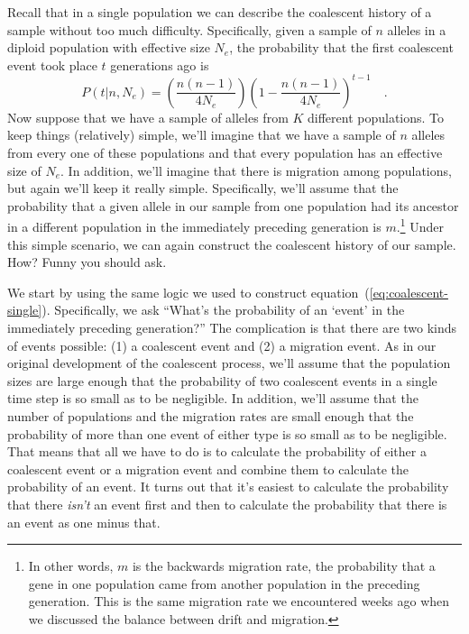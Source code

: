 \documentclass[12pt]{article}
\begin{document}
Recall that in a single population we can describe the coalescent
history of a sample without too much difficulty. Specifically, given a
sample of $n$ alleles in a diploid population with effective size
$N_e$, the probability that the first coalescent event took place $t$
generations ago is
\begin{equation}
P(t|n, N_e) = \left(\frac{n(n-1)}{4N_e}\right)\left(1-
  \frac{n(n-1)}{4N_e}\right)^{t-1} \quad . \label{eq:coalescent-single}
\end{equation}
Now suppose that we have a sample of alleles from $K$ different
populations. To keep things (relatively) simple, we'll imagine that we
have a sample of $n$ alleles from every one of these populations and
that every population has an effective size of $N_e$. In addition,
we'll imagine that there is migration among populations, but again
we'll keep it really simple. Specifically, we'll assume that the
probability that a given allele in our sample from one population had
its ancestor in a different population in the immediately preceding
generation is $m$.\footnote{In other words, $m$ is the backwards
  migration rate, the probability that a gene in one population came
  from another population in the preceding generation. This is the
  same migration rate we encountered weeks ago when we discussed the
  balance between drift and migration.} Under this simple scenario, we
can again construct the coalescent history of our sample. How? Funny
you should ask.

We start by using the same logic we used to construct
equation~(\ref{eq:coalescent-single}). Specifically, we ask ``What's
the probability of an `event' in the immediately preceding
generation?'' The complication is that there are two kinds of events
possible: (1) a coalescent event and (2) a migration event. As in our
original development of the coalescent process, we'll assume that the
population sizes are large enough that the probability of two
coalescent events in a single time step is so small as to be
negligible. In addition, we'll assume that the number of populations
and the migration rates are small enough that the probability of more
than one event of either type is so small as to be negligible. That
means that all we have to do is to calculate the probability of either
a coalescent event or a migration event and combine them to calculate
the probability of an event. It turns out that it's easiest to
calculate the probability that there {\it isn't\/} an event first and
then to calculate the probability that there is an event as one minus
that.
\end{document}
